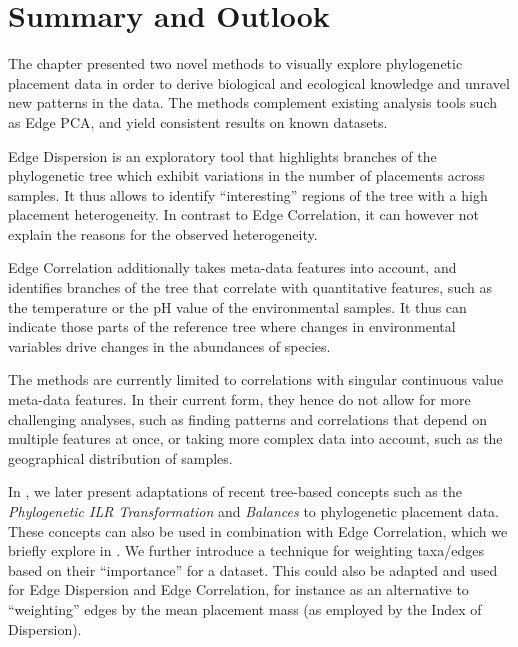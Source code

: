 
\section{Summary and Outlook}
\label{ch:Visualization:sec:SummaryOutlook}


The chapter presented two novel methods to visually explore phylogenetic placement data
in order to derive biological and ecological knowledge and unravel new patterns in the data.
The methods complement existing analysis tools such as Edge PCA,
and yield consistent results on known datasets.

Edge Dispersion is an exploratory tool that highlights branches of the phylogenetic tree
which exhibit variations in the number of placements across samples.
It thus allows to identify ``interesting'' regions of the tree with a high placement heterogeneity.
In contrast to Edge Correlation, it can however not explain the reasons for the observed heterogeneity.

Edge Correlation additionally takes meta-data features into account,
and identifies branches of the tree that correlate with quantitative features,
such as the temperature or the pH value of the environmental samples.
It thus can indicate those parts of the reference tree where changes in environmental variables
drive changes in the abundances of species.


The methods are currently limited to correlations with singular continuous value meta-data features.
In their current form, they hence do not allow for more challenging analyses,
such as finding patterns and correlations that depend on multiple features at once,
or taking more complex data into account, such as the geographical distribution of samples.

In , we later present adaptations of recent tree-based concepts
such as the \emph{Phylogenetic ILR Transformation} and \emph{Balances} \cite{Silverman2017} to phylogenetic placement data.
These concepts can also be used in combination with Edge Correlation,
which we briefly explore in .
We further introduce a technique for weighting taxa/edges based on their ``importance'' for a dataset.
This could also be adapted and used for Edge Dispersion and Edge Correlation,
for instance as an alternative to ``weighting'' edges by the mean placement mass
(as employed by the Index of Dispersion).

